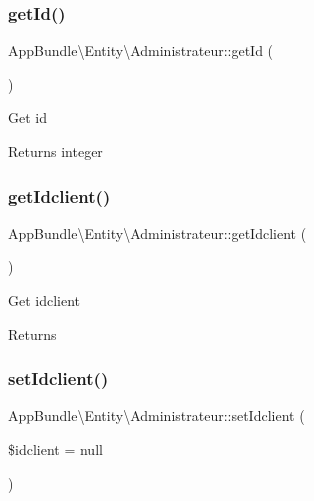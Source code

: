 \subsubsection{\texorpdfstring{get\+Id()}{getId()}}
{\footnotesize\ttfamily App\+Bundle\textbackslash{}\+Entity\textbackslash{}\+Administrateur\+::get\+Id (\begin{DoxyParamCaption}{ }\end{DoxyParamCaption})}

Get id

\begin{DoxyReturn}{Returns}
integer 
\end{DoxyReturn}
\mbox{\label{class_app_bundle_1_1_entity_1_1_administrateur_a88cc351a097727b251efa8d181bf9d5a}} 
\subsubsection{\texorpdfstring{get\+Idclient()}{getIdclient()}}
{\footnotesize\ttfamily App\+Bundle\textbackslash{}\+Entity\textbackslash{}\+Administrateur\+::get\+Idclient (\begin{DoxyParamCaption}{ }\end{DoxyParamCaption})}

Get idclient

\begin{DoxyReturn}{Returns}

\end{DoxyReturn}
\mbox{\label{class_app_bundle_1_1_entity_1_1_administrateur_a52af0e02de0a95232742d559fa184eac}} 
\subsubsection{\texorpdfstring{set\+Idclient()}{setIdclient()}}
{\footnotesize\ttfamily App\+Bundle\textbackslash{}\+Entity\textbackslash{}\+Administrateur\+::set\+Idclient (\begin{DoxyParamCaption}\item[{\textbackslash{}\hyperlink{class_app_bundle_1_1_entity_1_1_client}{App\+Bundle\textbackslash{}\+Entity\textbackslash{}\+Client}}]{\$idclient = {\ttfamily null} }\end{DoxyParamCaption})}

